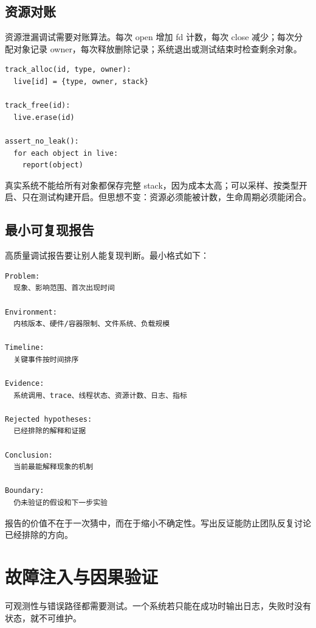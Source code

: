 \subsection{资源对账}

资源泄漏调试需要对账算法。每次 open 增加 fd 计数，每次 close 减少；每次分配对象记录 owner，每次释放删除记录；系统退出或测试结束时检查剩余对象。

\begin{lstlisting}
track_alloc(id, type, owner):
  live[id] = {type, owner, stack}

track_free(id):
  live.erase(id)

assert_no_leak():
  for each object in live:
    report(object)
\end{lstlisting}

真实系统不能给所有对象都保存完整 stack，因为成本太高；可以采样、按类型开启、只在测试构建开启。但思想不变：资源必须能被计数，生命周期必须能闭合。

\subsection{最小可复现报告}

高质量调试报告要让别人能复现判断。最小格式如下：

\begin{lstlisting}
Problem:
  现象、影响范围、首次出现时间

Environment:
  内核版本、硬件/容器限制、文件系统、负载规模

Timeline:
  关键事件按时间排序

Evidence:
  系统调用、trace、线程状态、资源计数、日志、指标

Rejected hypotheses:
  已经排除的解释和证据

Conclusion:
  当前最能解释现象的机制

Boundary:
  仍未验证的假设和下一步实验
\end{lstlisting}

报告的价值不在于一次猜中，而在于缩小不确定性。写出反证能防止团队反复讨论已经排除的方向。

\section{故障注入与因果验证}

可观测性与错误路径都需要测试。一个系统若只能在成功时输出日志，失败时没有状态，就不可维护。

